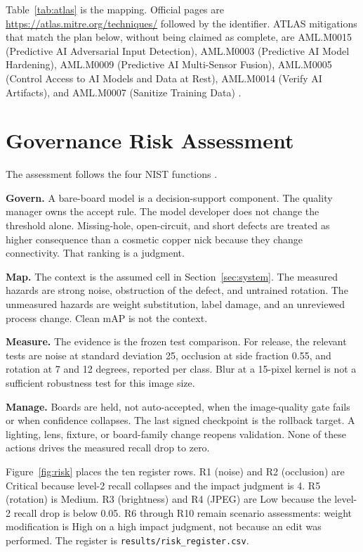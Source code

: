 \documentclass[conference]{IEEEtran}
\begin{document}
Table~\ref{tab:atlas} is the mapping. Official pages are \url{https://atlas.mitre.org/techniques/} followed by the identifier. ATLAS mitigations that match the plan below, without being claimed as complete, are AML.M0015 (Predictive AI Adversarial Input Detection), AML.M0003 (Predictive AI Model Hardening), AML.M0009 (Predictive AI Multi-Sensor Fusion), AML.M0005 (Control Access to AI Models and Data at Rest), AML.M0014 (Verify AI Artifacts), and AML.M0007 (Sanitize Training Data) \cite{mitre2026atlas}.

\section{Governance Risk Assessment}
\label{sec:gov}
The assessment follows the four NIST functions \cite{nist2023airmf,nist2023playbook}.

\textbf{Govern.} A bare-board model is a decision-support component. The quality manager owns the accept rule. The model developer does not change the threshold alone. Missing-hole, open-circuit, and short defects are treated as higher consequence than a cosmetic copper nick because they change connectivity. That ranking is a judgment.

\textbf{Map.} The context is the assumed cell in Section~\ref{sec:system}. The measured hazards are strong noise, obstruction of the defect, and untrained rotation. The unmeasured hazards are weight substitution, label damage, and an unreviewed process change. Clean mAP is not the context.

\textbf{Measure.} The evidence is the frozen test comparison. For release, the relevant tests are noise at standard deviation 25, occlusion at side fraction 0.55, and rotation at 7 and 12 degrees, reported per class. Blur at a 15-pixel kernel is not a sufficient robustness test for this image size.

\textbf{Manage.} Boards are held, not auto-accepted, when the image-quality gate fails or when confidence collapses. The last signed checkpoint is the rollback target. A lighting, lens, fixture, or board-family change reopens validation. None of these actions drives the measured recall drop to zero.

Figure~\ref{fig:risk} places the ten register rows. R1 (noise) and R2 (occlusion) are Critical because level-2 recall collapses and the impact judgment is 4. R5 (rotation) is Medium. R3 (brightness) and R4 (JPEG) are Low because the level-2 recall drop is below 0.05. R6 through R10 remain scenario assessments: weight modification is High on a high impact judgment, not because an edit was performed. The register is \texttt{results/risk\_register.csv}.
\end{document}
